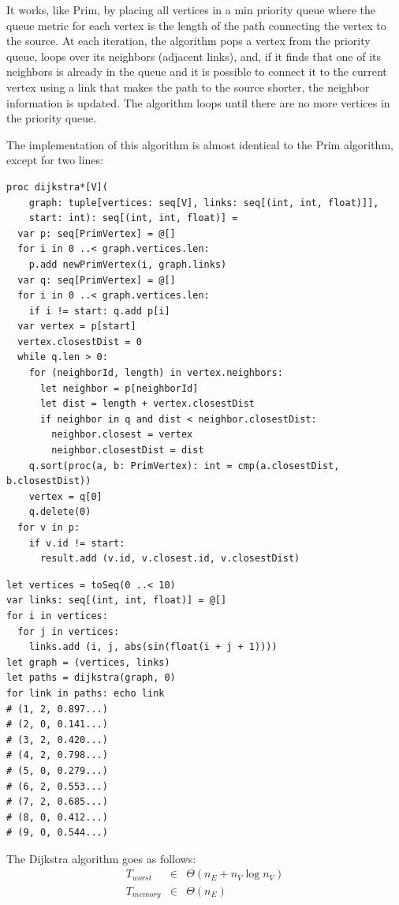 \documentclass[justified, sixbynine]{tufte-book}
\def\ft{\small\tt}
\theoremstyle{plain}%
\newtheorem * {corollary}{Corollary}
\theoremstyle{definition}
\theoremstyle{remark}
\newtheorem * {remark}{Remark}
\newtheorem * {note}{Note}
\begin{document}
\begin{fullwidth}
It works, like Prim, by placing all vertices in a min priority queue where the queue metric for each vertex is the length of the path connecting the vertex to the source. At each iteration, the algorithm pops a vertex from the priority queue, loops over its neighbors (adjacent links), and, if it finds that one of its neighbors is already in the queue and it is possible to connect it to the current vertex using a link that makes the path to the source shorter, the neighbor information is updated. The algorithm loops until there are no more vertices in the priority queue.

The implementation of this algorithm is almost identical to the Prim algorithm, except for two lines:

\begin{lstlisting}[caption={in file: {\ft nlib/graph.nim}}]
proc dijkstra*[V](
    graph: tuple[vertices: seq[V], links: seq[(int, int, float)]],
    start: int): seq[(int, int, float)] =
  var p: seq[PrimVertex] = @[]
  for i in 0 ..< graph.vertices.len:
    p.add newPrimVertex(i, graph.links)
  var q: seq[PrimVertex] = @[]
  for i in 0 ..< graph.vertices.len:
    if i != start: q.add p[i]
  var vertex = p[start]
  vertex.closestDist = 0
  while q.len > 0:
    for (neighborId, length) in vertex.neighbors:
      let neighbor = p[neighborId]
      let dist = length + vertex.closestDist
      if neighbor in q and dist < neighbor.closestDist:
        neighbor.closest = vertex
        neighbor.closestDist = dist
    q.sort(proc(a, b: PrimVertex): int = cmp(a.closestDist, b.closestDist))
    vertex = q[0]
    q.delete(0)
  for v in p:
    if v.id != start:
      result.add (v.id, v.closest.id, v.closestDist)
\end{lstlisting}

\begin{lstlisting}
let vertices = toSeq(0 ..< 10)
var links: seq[(int, int, float)] = @[]
for i in vertices:
  for j in vertices:
    links.add (i, j, abs(sin(float(i + j + 1))))
let graph = (vertices, links)
let paths = dijkstra(graph, 0)
for link in paths: echo link
# (1, 2, 0.897...)
# (2, 0, 0.141...)
# (3, 2, 0.420...)
# (4, 2, 0.798...)
# (5, 0, 0.279...)
# (6, 2, 0.553...)
# (7, 2, 0.685...)
# (8, 0, 0.412...)
# (9, 0, 0.544...)
\end{lstlisting}

The Dijkstra algorithm goes as follows:
\begin{eqnarray}
T_{worst} &\in &\Theta (n_E+n_V\log n_V) \\
T_{memory} &\in &\Theta (n_E)
\end{eqnarray}


\end{fullwidth}
\end{document}
